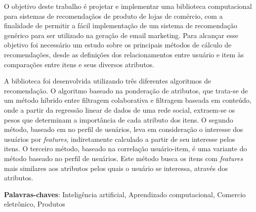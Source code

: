\setlength{\absparsep}{18pt} %
\begin{resumo}
O objetivo deste trabalho é projetar e implementar uma biblioteca computacional para sistemas de recomendaçãos de produto de lojas de comércio, com a finalidade de permitir a fácil implementação de um sistema de recomendação genérico para ser utilizado na geração de email marketing. Para alcançar esse objetivo foi necessário um estudo sobre os principais métodos de cálculo de recomendações, desde as definições dos relacionamentos entre usuário e item às comparações entre itens e seus diversos atributos.

A biblioteca foi desenvolvida utilizando três diferentes algoritmos de recomendação. O algoritmo baseado na ponderação de atributos, que trata-se de um método híbrido entre filtragem colaborativa e filtragem baseada em conteúdo, onde a partir da
regressão linear de dados de uma rede social, extraem-se os pesos que determinam a importância de cada atributo dos itens. O segundo método, baseado em no perfil de usuários, leva em consideração o interesse dos usuários por \textit{features}, indiretamente calculado a partir de seu interesse pelos itens. O terceiro método, baseado na correlação usuário-item, é uma variante do método baseado no perfil de usuários. Este método busca os itens com \textit{features} mais similares aos atributos pelos quais o usuário se interessa, através dos atributos.


 \textbf{Palavras-chaves}: Inteligência artificial, Aprendizado computacional, Comercio eletrônico, Produtos
\end{resumo}